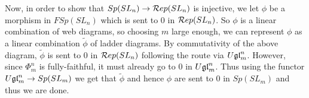 \documentclass[11pt,leqno]{article}
\begin{document}
Now, in order to show that $ Sp(SL_n) \rightarrow \mathcal{R}ep(SL_{n}) $ is injective, we let $ \phi $ be a morphism in $ FSp(SL_n)$ which is sent to 0 in $ \mathcal{R}ep(SL_{n}) $.  So $ \phi $ is a linear combination of web diagrams, so choosing $m$ large enough, we can represent $ \phi $ as a linear combination $ \tilde{\phi} $ of ladder diagrams.   By commutativity of the above diagram, $ \tilde{\phi} $ is sent to 0 in $ \mathcal{R}ep(SL_{n}) $ following the route via $ U\mathfrak{gl}_{m}^n $.  However, since $ \Phi_m^n $ is fully-faithful, it must already go to 0 in $ U\mathfrak{gl}_{m}^n $.  Thus using the functor $ U\mathfrak{gl}_{m}^n \rightarrow Sp(SL_m) $ we get that $ \tilde{\phi} $ and hence $ \phi $ are sent to 0 in $ Sp(SL_m) $ and thus we are done.





\end{document}
